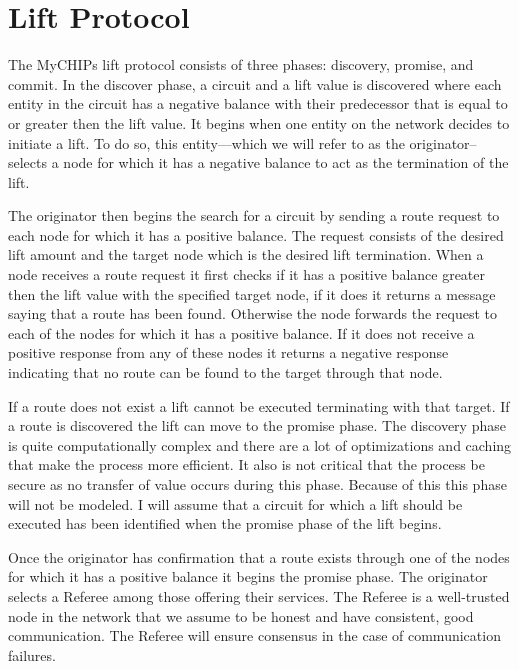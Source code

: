\documentclass[article, onecolumn, 12pt]{IEEEtran}
\begin{document}
\section{Lift Protocol}
The MyCHIPs lift protocol consists of three phases: discovery, promise, and commit. In the discover phase, a circuit and a lift value is discovered where each entity in the circuit has a negative balance with their predecessor that is equal to or greater then the lift value. It begins when one entity on the network decides to initiate a lift. To do so, this entity---which we will refer to as the originator--selects a node for which it has a negative balance to act as the termination of the lift.

The originator then begins the search for a circuit by sending a route request to each node for which it has a positive balance. The request consists of the desired lift amount and the target node which is the desired lift termination. When a node receives a route request it first checks if it has a positive balance greater then the lift value with the specified target node, if it does it returns a message saying that a route has been found. Otherwise the node forwards the request to each of the nodes for which it has a positive balance. If it does not receive a positive response from any of these nodes it returns a negative response indicating that no route can be found to the target through that node.


If a route does not exist a lift cannot be executed terminating with that target. If a route is discovered the lift can move to the promise phase. The discovery phase is quite computationally complex and there are a lot of optimizations and caching that make the process more efficient. It also is not critical that the process be secure as no transfer of value occurs during this phase. Because of this this phase will not be modeled. I will assume that a circuit for which a lift should be executed has been identified when the promise phase of the lift begins.

Once the originator has confirmation that a route exists through one of the nodes for which it has a positive balance it begins the promise phase.
The originator selects a Referee among those offering their services. The Referee is a well-trusted node in the network that we assume to be honest and have consistent, good communication. The Referee will ensure consensus in the case of communication failures.
\end{document}
